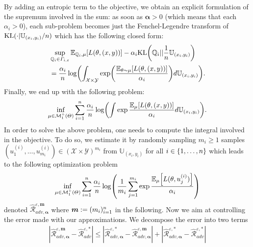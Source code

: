 By adding an entropic term to the objective, we obtain an explicit formulation of the supremum involved in the sum: as soon as $\bm{\alpha}>0$ (which means that each $\alpha_i>0$), each sub-problem becomes just the Fenchel-Legendre transform of $\text{KL}(\cdot|\mathbb{U}_{(x_i,y_i)}/n)$ which has the following closed form:
\begin{align*}
 &\sup_{\QQ_i\in\Gamma_{i,\varepsilon}}\mathbb{E}_{\QQ_i, \mu}\left[\loss(\theta,(x,y))\right]-\alpha_i\text{KL}\left(\QQ_i||\frac{1}{\numsamples}\mathbb{U}_{(x_i,y_i)}\right)\\
 &=\frac{\alpha_i}{\numsamples}\log\left( \int_{\mathcal{X}\times\mathcal{Y}}\exp\left(\frac{\mathbb{E}_{\theta \sim \mu}\left[\loss(\theta,(x,y))\right]}{\alpha_i}\right)d\mathbb{U}_{(x_i,y_i)}\right).
\end{align*}
Finally, we end up with the following problem: 
\begin{align*}
  \inf_{\mu\in \mathcal{M}^+_1(\Theta)}\sum_{i=1}^\numsamples  \frac{\alpha_i}{\numsamples}\log\left( \int\exp\frac{\mathbb{E}_{ \mu}\left[\loss(\theta,(x,y))\right]}{\alpha_i}d\mathbb{U}_{(x_i,y_i)}\right).
\end{align*}
In order to solve the above problem, one needs to compute the integral involved in the objective. To do so, we estimate it by randomly sampling $m_i\geq 1$ samples $(u_1^{(i)},\dots,u_{m_i}^{(i)})\in(\mathcal{X}\times\mathcal{Y})^{m_i}$ from $\mathbb{U}_{(x_i,y_i)}$ for all $i\in\{1,\dots,n\}$ which leads to the following optimization problem
\begin{align}
\label{eq-obj-sample}
  \inf_{\mu\in \mathcal{M}^+_1(\Theta)}\sum_{i=1}^\numsamples  \frac{\alpha_i}{\numsamples}\log\left( \frac{1}{m_i}\sum_{j=1}^{m_i}\exp\frac{\mathbb{E}_{ \mu}\left[\loss(\theta,u_j^{(i)})\right]}{\alpha_i}\right)
\end{align}
denoted $\widehat{\mathcal{R}}_{adv,\bm{\alpha}}^{\varepsilon,\bm{m}}$ where $\bm{m}:=(m_i)_{i=1}^n$ in the following. Now we aim at controlling the error made with our approximations. We decompose the error into two terms
\begin{align*}
  |\widehat{\mathcal{R}}_{adv,\bm{\alpha}}^{\varepsilon,\bm{m}} - \widehat{\mathcal{R}}_{adv}^{\varepsilon,*}|
   \leq |\widehat{\mathcal{R}}_{adv,\bm{\alpha}}^{\varepsilon,*} - \widehat{\mathcal{R}}_{adv,\bm{\alpha}}^{\varepsilon,\bm{m}}| +|\widehat{\mathcal{R}}_{adv,\bm{\alpha}}^{\varepsilon,*} - \widehat{\mathcal{R}}_{adv}^{\varepsilon,*}|
\end{align*}
